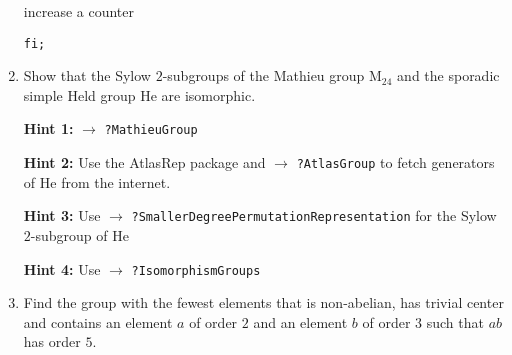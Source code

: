 \documentclass[12pt]{article}
\newcommand{\hint}[1]{\par\textbf{Hint #1:}}
\newcommand{\see}[1]{$\to$ \texttt{?#1}}
\begin{document}
\begin{enumerate}
\hspace*{1cm} increase a counter

\texttt{fi;}
\item Show that the Sylow $2$-subgroups of the Mathieu group $\mathrm{M}_{24}$ 
and the
sporadic simple Held group $\mathrm{He}$ are isomorphic.
\hint{1} \see{MathieuGroup}
\hint{2} Use the \textsf{AtlasRep} package and \see{AtlasGroup} to fetch
generators of $\mathrm{He}$ from the internet.
\hint{3} Use \see{SmallerDegreePermutationRepresentation} for the
Sylow $2$-subgroup of $\mathrm{He}$
\hint{4} Use \see{IsomorphismGroups}
\item Find the group with the fewest elements that is non-abelian, has 
trivial center and contains an element $a$ of order $2$ and an element
$b$ of order $3$ such that $ab$ has order $5$.
\end{enumerate}
\end{document}
